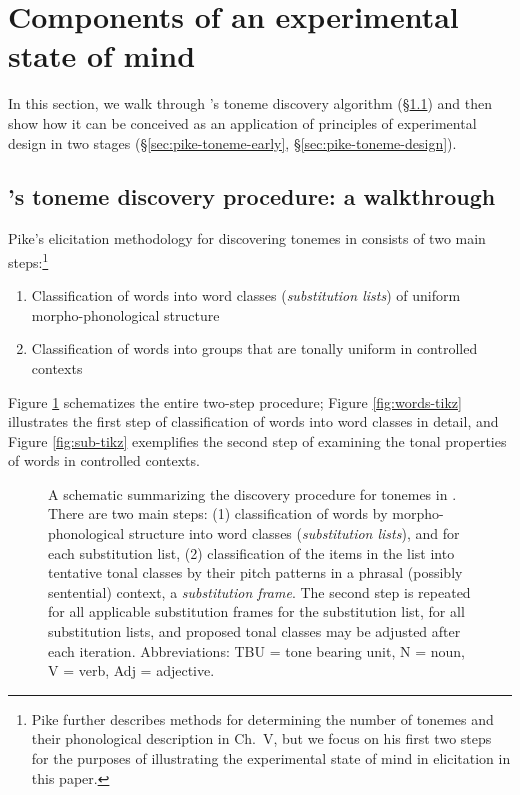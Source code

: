 \documentclass[12pt]{article}
\begin{document}
\section{Components of an experimental state of mind}
\label{sec:components}

In this section, we walk through \citet{Pike:1948}'s toneme discovery
algorithm (\S\ref{sec:pike-toneme}) and then show how it can be
conceived as an application of principles of experimental design in
two stages (\S\ref{sec:pike-toneme-early}, \S\ref{sec:pike-toneme-design}). 

\subsection{\citet{Pike:1948}'s toneme discovery procedure: a walkthrough}
\label{sec:pike-toneme}

Pike's elicitation methodology for discovering tonemes in
\citet[Ch.\ IV, p.\ 48-54]{Pike:1948} consists of two
main steps:\footnote{Pike further describes methods for
  determining the number of tonemes and their phonological description
  in Ch.\ V, but we focus on his first two steps for the purposes of
  illustrating the experimental state of mind in elicitation in this paper.}
\begin{enumerate}
\item Classification of words into
  word classes (\textit{substitution lists}) of uniform morpho-phonological structure 
\item Classification of words into groups that are tonally uniform in
  controlled contexts
\end{enumerate}

Figure \ref{fig:pike-tikz} schematizes the entire two-step procedure;
Figure \ref{fig:words-tikz} illustrates the first step of
classification of words into word classes in detail, and Figure
\ref{fig:sub-tikz} exemplifies the second step of examining the tonal
properties of words in controlled contexts.

\begin{figure}
  \centering
  \caption{A schematic summarizing the discovery procedure for tonemes
    in \citet[Ch.\ 4]{Pike:1948}. There are two main steps: (1)
  classification of words by morpho-phonological structure into word
  classes (\textit{substitution lists}), and for each substitution list, (2)
  classification of the items in the list into tentative tonal classes by their
  pitch patterns in a phrasal (possibly sentential) context, a \textit{substitution frame}. The second step is
  repeated for all applicable substitution frames for the substitution
list, for all substitution lists, and proposed tonal classes may be
adjusted after each iteration. Abbreviations: TBU = tone bearing
unit, N = noun, V = verb, Adj = adjective.}
  \label{fig:pike-tikz}
\end{figure}
\end{document}
